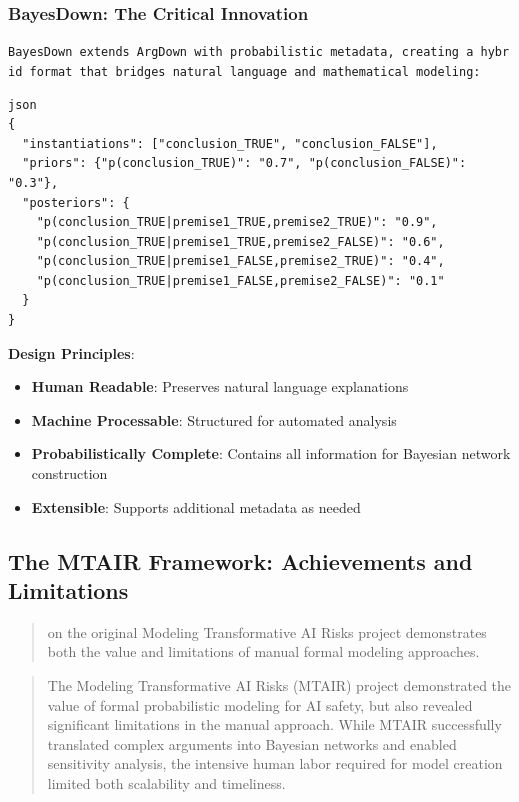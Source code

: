 \documentclass[
  11pt,
  letterpaper,
]{book}
\providecommand{\tightlist}{%
  \setlength{\itemsep}{0pt}\setlength{\parskip}{0pt}}
\begin{document}
\subsubsection{BayesDown: The Critical
Innovation}\label{sec-bayesdown-innovation}

\texttt{BayesDown\ extends\ ArgDown\ with\ probabilistic\ metadata,\ creating\ a\ hybrid\ format\ that\ bridges\ natural\ language\ and\ mathematical\ modeling:}

\begin{verbatim}
json
{
  "instantiations": ["conclusion_TRUE", "conclusion_FALSE"],
  "priors": {"p(conclusion_TRUE)": "0.7", "p(conclusion_FALSE)": "0.3"},
  "posteriors": {
    "p(conclusion_TRUE|premise1_TRUE,premise2_TRUE)": "0.9",
    "p(conclusion_TRUE|premise1_TRUE,premise2_FALSE)": "0.6",
    "p(conclusion_TRUE|premise1_FALSE,premise2_TRUE)": "0.4",
    "p(conclusion_TRUE|premise1_FALSE,premise2_FALSE)": "0.1"
  }
}
\end{verbatim}

\textbf{Design Principles}:

\begin{itemize}
\tightlist
\item
  \textbf{Human Readable}: Preserves natural language explanations
\item
  \textbf{Machine Processable}: Structured for automated analysis
\item
  \textbf{Probabilistically Complete}: Contains all information for
  Bayesian network construction
\item
  \textbf{Extensible}: Supports additional metadata as needed
\end{itemize}

\subsection{The MTAIR Framework: Achievements and
Limitations}\label{sec-mtair-framework}

\begin{quote}
\textcite{bucknall2022} on the original Modeling Transformative AI Risks
project demonstrates both the value and limitations of manual formal
modeling approaches.
\end{quote}

\begin{quote}
The Modeling Transformative AI Risks (MTAIR) project demonstrated the
value of formal probabilistic modeling for AI safety, but also revealed
significant limitations in the manual approach. While MTAIR successfully
translated complex arguments into Bayesian networks and enabled
sensitivity analysis, the intensive human labor required for model
creation limited both scalability and timeliness.
\end{quote}
\end{document}
